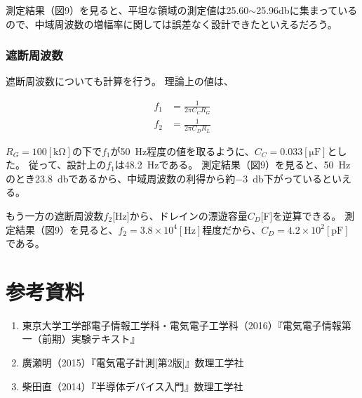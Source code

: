 \documentclass[10pt,a4j,dvipdfmx]{jsarticle}
\makeatletter
\let\@oldsec\section
\renewcommand{\section}[1]{\@oldsec{#1}\vspace{-5pt}{\color{TealBlue}\hrule height 0.6pt \hfill}\par}
\makeatother
\begin{document}
測定結果（図9）を見ると、平坦な領域の測定値は25.60$\sim$25.96\si{\decibel}に集まっているので、中域周波数の増幅率に関しては誤差なく設計できたといえるだろう。
\subsubsection{遮断周波数}
遮断周波数についても計算を行う。
理論上の値は、

\begin{align}
f_1 &= \frac{1}{2\pi C_C R_G} \\
f_2 &= \frac{1}{2\pi C_D R_L}
\end{align}

$R_G=100[\si{\kilo\ohm}]$の下で$f_1$が\SI{50}{\hertz}程度の値を取るように、$C_C = 0.033[\si{\micro\farad}]$とした。
従って、設計上の$f_1$は\SI{48.2}{\hertz}である。
測定結果（図9）を見ると、\SI{50}{\hertz}のとき\SI{23.8}{\decibel}であるから、中域周波数の利得から約\SI{-3}{\decibel}下がっているといえる。

もう一方の遮断周波数$f_2$[\si{\hertz}]から、ドレインの漂遊容量$C_D$[\si{\farad}]を逆算できる。
測定結果（図9）を見ると、$f_2 = 3.8\times10^4[\si{\hertz}]$程度だから、$C_D = 4.2\times10^2[\si{\pico\farad}]$である。

\section{参考資料}
\begin{enumerate}
\item 東京大学工学部電子情報工学科・電気電子工学科（2016）『電気電子情報第一（前期）実験テキスト』
\item 廣瀬明（2015）『電気電子計測[第2版]』数理工学社
\item 柴田直（2014）『半導体デバイス入門』数理工学社
\end{enumerate}
\end{document}
